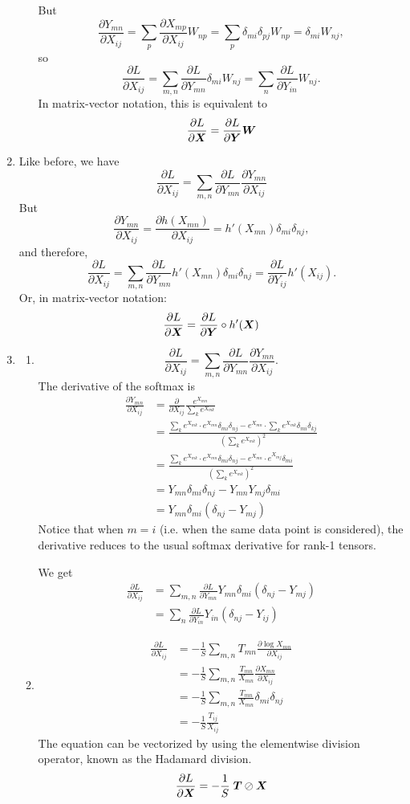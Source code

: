 \documentclass{article}
\newcommand{\pfrac}[2]{\frac{\partial #1}{\partial #2}}
\begin{document}
\begin{enumerate}[label=(\alph*)]
\begin{enumerate}[label=(\roman*)]
$$	$$ But
	$$
	\pfrac{Y_{mn}}{X_{ij}} = \sum_p\pfrac{X_{mp}}{X_{ij}}W_{np} = \sum_p\delta_{mi}\delta_{pj}W_{np} = \delta_{mi}W_{nj},
	$$
	so
	$$
	\pfrac{L}{X_{ij}} = \sum_{m, n}\pfrac{L}{Y_{mn}}\delta_{mi}W_{nj} = \sum_n \pfrac{L}{Y_{in}}W_{nj}.
	$$ In matrix-vector notation, this is equivalent to
	$$
	\pfrac{L}{\b X} = \pfrac{L}{\b Y}\b W
	$$
\end{enumerate}
	\item Like before, we have
	$$
	\pfrac{L}{X_{ij}} = \sum_{m, n}\pfrac{L}{Y_{mn}}\pfrac{Y_{mn}}{X_{ij}}
	$$ But
	$$
	\pfrac{Y_{mn}}{X_{ij}} = \pfrac{h(X_{mn})}{X_{ij}} = h'(X_{mn})\delta_{mi}\delta_{nj},
	$$ and therefore,
	$$
	\pfrac{L}{X_{ij}} = \sum_{m, n}\pfrac{L}{Y_{mn}}h'(X_{mn})\delta_{mi}\delta_{nj} = \pfrac{L}{Y_{ij}}h'(X_{ij}).
	$$ Or, in matrix-vector notation:
	$$\pfrac{L}{\b X} = \pfrac{L}{\b Y} \circ h'(\b X)$$
	\item
	\begin{enumerate}[label=(\roman*)]
		\item
		$$
		 \pfrac{L}{X_{ij}} = \sum_{m, n}\pfrac{L}{Y_{mn}}\pfrac{Y_{mn}}{X_{ij}}.
		$$ The derivative of the softmax is
		$$
		\begin{aligned}
		\pfrac{Y_{mn}}{X_{ij}} &= \pfrac{}{X_{ij}} \frac{e^{X_{mn}}}{\sum_ke^{X_{mk}}} \\ &= \frac{\sum_ke^{X_{mk}} \cdot e^{X_{mn}}\delta_{mi}\delta_{nj} - e^{X_{mn}}\cdot\sum_ke^{X_{mk}}\delta_{mi}\delta_{kj}}{\left(\sum_ke^{X_{mk}}\right)^2} \\ &= \frac{\sum_ke^{X_{mk}} \cdot e^{X_{mn}}\delta_{mi}\delta_{nj} - e^{X_{mn}}\cdot e^{X_{mj}}\delta_{mi}}{\left(\sum_ke^{X_{mk}}\right)^2}\\
		&= Y_{mn}\delta_{mi}\delta_{nj} - Y_{mn}Y_{mj}\delta_{mi} \\ &= Y_{mn}\delta_{mi}\left(\delta_{nj} - Y_{mj}\right)
		\end{aligned}
		$$ Notice that when $m = i$ (i.e. when the same data point is considered), the derivative reduces to the usual softmax derivative for rank-1 tensors.
		
		We get
		$$
		\begin{aligned}
		\pfrac{L}{X_{ij}} &= \sum_{m, n}\pfrac{L}{Y_{mn}}Y_{mn}\delta_{mi}\left(\delta_{nj} - Y_{mj}\right) \\ &= \sum_n\pfrac{L}{Y_{in}}Y_{in}\left(\delta_{nj} - Y_{ij}\right)
		\end{aligned}
		$$
		\item 
		$$
		\begin{aligned}
		\pfrac{L}{X_{ij}} &= -\frac{1}{S}\sum_{m, n}T_{mn}\pfrac{\log X_{mn}}{X_{ij} }\\ &= -\frac{1}{S}\sum_{m, n}\frac{T_{mn}}{X_{mn}}\pfrac{X_{mn}}{X_{ij}} \\ &= -\frac{1}{S}\sum_{m, n}\frac{T_{mn}}{X_{mn}}\delta_{mi}\delta_{nj} \\ &= -\frac{1}{S}\frac{T_{ij}}{X_{ij}}
		\end{aligned}
		$$ The equation can be vectorized by using the elementwise division operator, known as the Hadamard division.
		$$
		\pfrac{L}{\b X} = -\frac{1}{S} \; \b T \oslash \b X
		$$
	\end{enumerate}
\end{enumerate}
\end{document}
